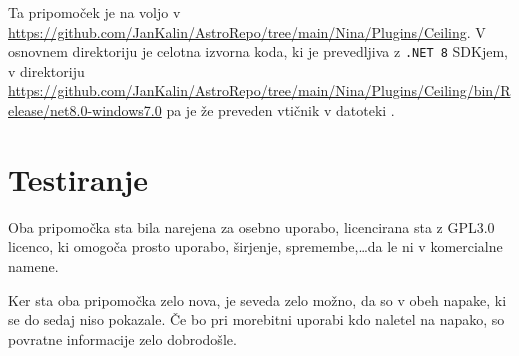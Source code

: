 \documentclass[11pt]{article}
\begin{document}
Ta pripomoček je na voljo v \url{https://github.com/JanKalin/AstroRepo/tree/main/Nina/Plugins/Ceiling}. V osnovnem direktoriju je celotna izvorna koda, ki je prevedljiva z \texttt{.NET 8} SDKjem, v direktoriju \url{https://github.com/JanKalin/AstroRepo/tree/main/Nina/Plugins/Ceiling/bin/Release/net8.0-windows7.0} pa je že preveden vtičnik v datoteki .

\section{Testiranje}

Oba pripomočka sta bila narejena za osebno uporabo, licencirana sta z GPL3.0 licenco, ki omogoča prosto uporabo, širjenje, spremembe,\ldots da le ni v komercialne namene.

Ker sta oba pripomočka zelo nova, je seveda zelo možno, da so v obeh napake, ki se do sedaj niso pokazale. Če bo pri morebitni uporabi kdo naletel na napako, so povratne informacije zelo dobrodošle.
\end{document}
